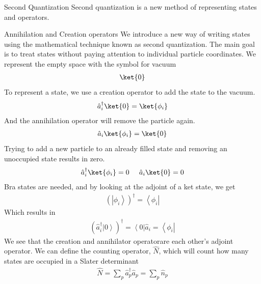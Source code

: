 \documentclass[twoside,english]{uiofysmaster}
\begin{document}
\begin{chapter}{Second Quantization}
 	Second quantization is a new method of representing states and operators. 
	\begin{section}{Annihilation and Creation operators}
		We introduce a new way of writing states using the mathematical technique known as second quantization. The main goal is to treat states without paying attention
		to individual particle coordinates. We represent the empty space with the symbol for vacuum
		\begin{align}
			\ket{0}
		\end{align}
		To represent a state, we use a creation operator to add the state to the vacuum.
		\begin{align}
			\hat a_i^{\dagger} \ket{0} = \ket{\phi_i}
		\end{align}
		And the annihilation operator will remove the particle again. 
		\begin{align}
			\hat a_i \ket{\phi_i} = \ket{0}
		\end{align}
		Trying to add a new particle to an already filled state and removing an unoccupied state results in zero.
		\begin{align}
			\hat a_i^{\dagger} \ket{\phi_i} = 0 \;\;\;\;\; \hat a_i \ket{0} = 0
		\end{align}
		Bra states are needed, and by looking at the adjoint of a ket state, we get
		\begin{align}
			\left(\left| \phi_i \right> \right)^\dagger = \left< \phi_i \right| 
		\end{align}
		Which results in
		\begin{align}
			\left( \hat a_i^\dagger \left| 0 \right> \right)^\dagger = \left< 0 \right| \hat a_i = \left< \phi_i \right|
		\end{align}
		We see that the creation and annihilator operatorare each other's adjoint operator. We can define the counting operator, $\hat N$, which will count how many states are occupied in a Slater determinant
		\begin{align}
			\hat N = \sum_p \hat a^\dagger_p \hat a_p = \sum_p \hat n_p
		\end{align}
	\end{section}


\end{chapter}
\end{document}
